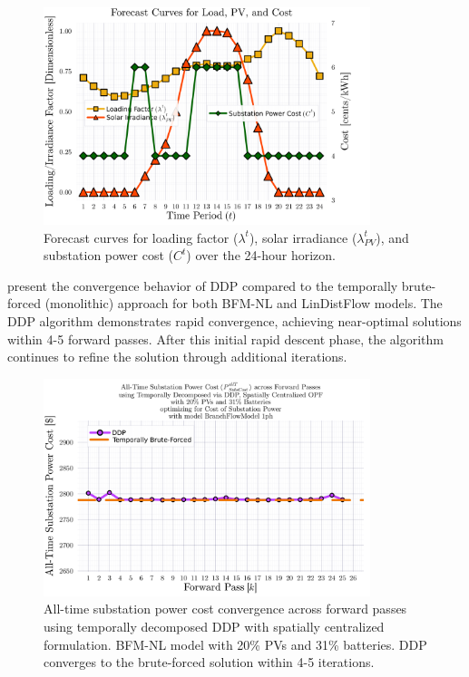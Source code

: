 \begin{figure}[h]
    \centering
    \includegraphics[width=0.85\textwidth]{figures/Horizon_24_InputForecastCurves_bilevelCosts.png}
    \caption{Forecast curves for loading factor ($\lambda^t$), solar irradiance ($\lambda_{PV}^t$), and substation power cost ($C^t$) over the 24-hour horizon.}
    \label{fig:ddp-input-curves}
\end{figure}

 present the convergence behavior of DDP compared to the temporally brute-forced (monolithic) approach for both BFM-NL and LinDistFlow models. The DDP algorithm demonstrates rapid convergence, achieving near-optimal solutions within 4-5 forward passes. After this initial rapid descent phase, the algorithm continues to refine the solution through additional iterations.

\begin{figure}[h]
    \centering
    \includegraphics[width=0.85\textwidth]{figures/SubstationPowerCostAllTime_vs_k_26_for_subsPowerCost_min_with_scd_alpha_8_994_gamma_0_0_via_tmprl_dcmpsd_spat_centr_system_with_bfm_NL_1ph.png}
    \caption{All-time substation power cost convergence across forward passes using temporally decomposed DDP with spatially centralized formulation. BFM-NL model with 20\% PVs and 31\% batteries. DDP converges to the brute-forced solution within 4-5 iterations.}
    \label{fig:ddp-convergence-bfm}
\end{figure}

